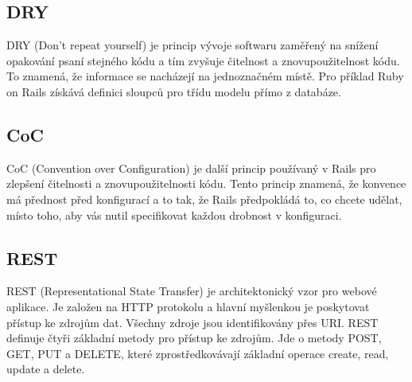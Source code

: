 \subsection{DRY}
\label{dry}
DRY (Don’t repeat yourself) \cite{dry} je princip vývoje softwaru zaměřený na snížení opakování psaní stejného kódu a tím zvyšuje čitelnost a znovupoužitelnost kódu. To znamená, že informace se nacházejí na jednoznačném místě. Pro příklad Ruby on Rails získává definici sloupců pro třídu modelu přímo z databáze.  

\subsection{CoC}
\label{coc}
CoC (Convention over Configuration) \cite{coc} je další princip používaný v Rails pro zlepšení čitelnosti a znovupoužitelnosti kódu. Tento princip znamená, že konvence má přednost před konfigurací a to tak, že Rails předpokládá to, co chcete udělat, místo toho, aby vás nutil specifikovat každou drobnost v konfiguraci. 

\subsection{REST}
\label{rest}
REST (Representational State Transfer) \cite{rest} je architektonický vzor pro webové aplikace. Je založen na HTTP protokolu a hlavní myšlenkou je poskytovat přístup ke zdrojům dat. Všechny zdroje jsou identifikovány přes URI. REST definuje čtyři základní metody pro přístup ke zdrojům. Jde o metody POST, GET, PUT a DELETE, které zprostředkovávají základní operace create, read, update a delete.

